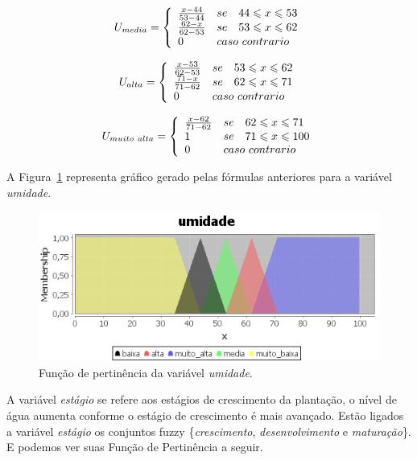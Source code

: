 \documentclass[
	article,			%
	11pt,				%
	oneside,			%
	a4paper,			%
	english,			%
	brazil,				%
	sumario=tradicional
	]{abntex2}
\begin{document}
\begin{multicols}{2}
$$
  U_{media} = \left\{
  \begin{array}{lll}
  \frac{x - 44}{53 - 44} & se & 44 \leqslant x \leqslant 53 \\
  \frac{62 - x}{62 - 53} & se & 53 \leqslant x \leqslant 62 \\
  0 & \multicolumn{2}{l}{caso~contrario}
  \end{array}
  \right.
$$

$$
  U_{alta} = \left\{
  \begin{array}{lll}
  \frac{x - 53}{62 - 53} & se & 53 \leqslant x \leqslant 62 \\
  \frac{71 - x}{71 - 62} & se & 62 \leqslant x \leqslant 71 \\
  0 & \multicolumn{2}{l}{caso~contrario}
  \end{array}
  \right.
$$

$$
  U_{muito~alta} = \left\{
  \begin{array}{lll}
  \frac{x - 62}{71 - 62} & se & 62 \leqslant x \leqslant 71 \\
  1 & se & 71 \leqslant x \leqslant 100 \\
  0 & \multicolumn{2}{l}{caso~contrario}
  \end{array}
  \right.
$$

A Figura~\ref{fig:fuzzyumidade} representa gráfico gerado pelas fórmulas anteriores para a variável \textit{umidade}.

\begin{figure}[H]
  \centering
  \includegraphics[width=1\linewidth]{fuzzy_umidade}
  \caption{Função de pertinência da variável \textit{umidade}.}
  \label{fig:fuzzyumidade}
\end{figure}

A variável \textit{estágio} se refere aos estágios de crescimento da plantação, o nível de água aumenta conforme o estágio de crescimento é mais avançado. Estão ligados a variável \textit{estágio} os conjuntos fuzzy \{\textit{crescimento}, \textit{desenvolvimento} e \textit{maturação}\}. E podemos ver suas Função de Pertinência a seguir.


\end{multicols}
\end{document}
